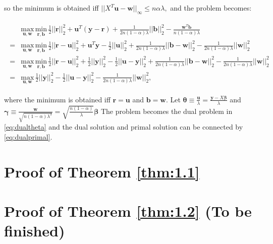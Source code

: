 so the minimum is obtained iff $||X^T\boldsymbol u-\boldsymbol w||_\infty\leq n\alpha\lambda,$ and the problem becomes:

\begin{gather}
    \label{eq:dualuw}
    \begin{aligned}
        &\underset{\boldsymbol u,\boldsymbol w}{\mathrm{max}}\,\underset{\boldsymbol r,\boldsymbol b}{\mathrm{min}}\,\frac{1}{2}||\boldsymbol r||_2^2+\boldsymbol u^T(\boldsymbol y-\boldsymbol r)+\frac{1}{2n(1-\alpha)\lambda}||\boldsymbol b||_2^2-\frac{\boldsymbol w^T\boldsymbol b}{n(1-\alpha)\lambda}\\
        =&\underset{\boldsymbol u,\boldsymbol w}{\mathrm{max}}\,\underset{\boldsymbol r,\boldsymbol b}{\mathrm{min}}\,\frac{1}{2}||\boldsymbol r-\boldsymbol u||_2^2+\boldsymbol u^T\boldsymbol y-\frac{1}{2}||\boldsymbol u||_2^2+\frac{1}{2n(1-\alpha)\lambda}||\boldsymbol b-\boldsymbol w||_2^2-\frac{1}{2n(1-\alpha)\lambda}||\boldsymbol w||_2^2\\
        =&\underset{\boldsymbol u,\boldsymbol w}{\mathrm{max}}\,\underset{\boldsymbol r,\boldsymbol b}{\mathrm{min}}\,\frac{1}{2}||\boldsymbol r-\boldsymbol u||_2^2+\frac{1}{2}||\boldsymbol y||_2^2-\frac{1}{2}||\boldsymbol u-\boldsymbol y||_2^2+\frac{1}{2n(1-\alpha)\lambda}||\boldsymbol b-\boldsymbol w||_2^2-\frac{1}{2n(1-\alpha)\lambda}||\boldsymbol w||_2^2\\
        =&\underset{\boldsymbol u,\boldsymbol w}{\mathrm{max}}\,\frac{1}{2}||\boldsymbol y||_2^2-\frac{1}{2}||\boldsymbol u-\boldsymbol y||_2^2-\frac{1}{2n(1-\alpha)\lambda}||\boldsymbol w||_2^2,
    \end{aligned}
\end{gather}

where the minimum is obtained iff $\boldsymbol r=\boldsymbol u$ and $\boldsymbol b=\boldsymbol w$. Let $\boldsymbol\theta\equiv\frac{\boldsymbol u}{\lambda}=\frac{\boldsymbol y-X\boldsymbol\beta}{\lambda}$ and $\boldsymbol\gamma\equiv\frac{\boldsymbol w}{\sqrt{n(1-\alpha)\lambda^3}}=\sqrt{\frac{n(1-\alpha)}{\lambda}}\boldsymbol\beta$ The problem becomes the dual problem in \eqref{eq:dualtheta} and the dual solution and primal solution can be connected by \eqref{eq:dualprimal}.

\section{Proof of Theorem \ref{thm:1.1}}

\section{Proof of Theorem \ref{thm:1.2} (To be finished)}


